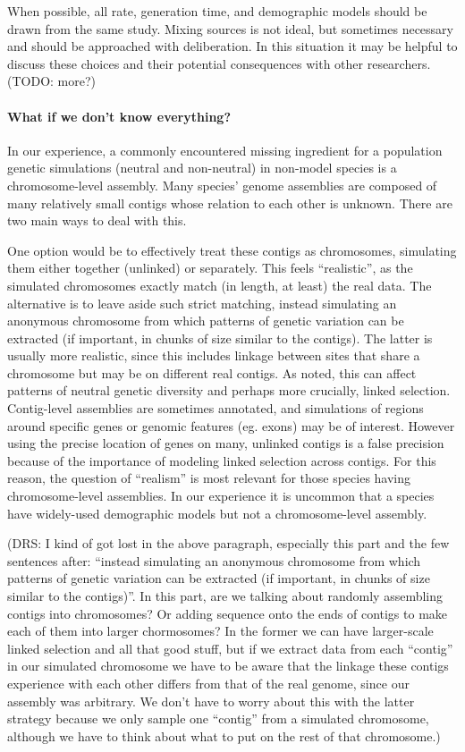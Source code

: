 \documentclass[hidelinks]{article}
\begin{document}
When possible, all rate, generation time, and demographic models should
be drawn from the same study. Mixing sources is not ideal, but sometimes
necessary and should be approached with deliberation. In this situation
it may be helpful to discuss these choices and their potential
consequences with other researchers. (TODO: more?)

\hypertarget{what-if-we-dont-know-everything}{%
\paragraph{What if we don't know
everything?}\label{what-if-we-dont-know-everything}}

In our experience, a commonly encountered missing ingredient for a
population genetic simulations (neutral and non-neutral) in non-model
species is a chromosome-level assembly. Many species' genome assemblies
are composed of many relatively small contigs whose relation to each
other is unknown. There are two main ways to deal with this.

One option would be to effectively treat these contigs as chromosomes,
simulating them either together (unlinked) or separately. This feels
``realistic'', as the simulated chromosomes exactly match (in length, at
least) the real data. The alternative is to leave aside such strict
matching, instead simulating an anonymous chromosome from which patterns
of genetic variation can be extracted (if important, in chunks of size
similar to the contigs). The latter is usually more realistic,
since this includes linkage between sites that share a chromosome but
may be on different real contigs. As noted, this can affect patterns of neutral genetic
diversity and perhaps more crucially, linked selection. Contig-level
assemblies are sometimes annotated, and simulations of regions around
specific genes or genomic features (eg. exons) may be of interest.
However using the precise location of genes on many, unlinked contigs is
a false precision because of the importance of modeling linked selection
across contigs. For this reason, the question of ``realism'' is most
relevant for those species having chromosome-level assemblies. In our
experience it is uncommon that a species have widely-used demographic
models but not a chromosome-level assembly.

(DRS: I kind of got lost in the above paragraph, especially this part and the
few sentences after: ``instead simulating an anonymous chromosome from which patterns
of genetic variation can be extracted (if important, in chunks of size similar
to the contigs)''. In this part, are we talking about randomly assembling contigs
into chromosomes? Or adding sequence onto the ends of contigs to make each of them
into larger chormosomes? In the former we can have larger-scale linked selection
and all that good stuff, but if we extract data from each ``contig'' in our simulated
chromosome we have to be aware that the linkage these contigs experience with each
other differs from that of the real genome, since our assembly was arbitrary. We
don't have to worry about this with the latter strategy because we only sample one
``contig'' from a simulated chromosome, although we have to think about what to put
on the rest of that chromosome.)
\end{document}
